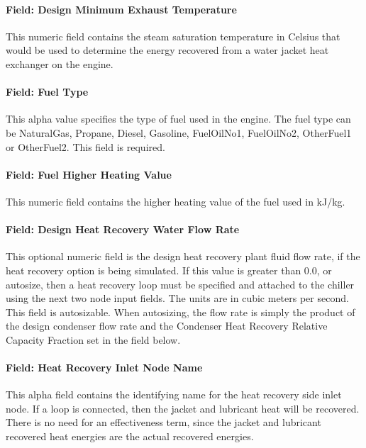 \paragraph{Field: Design Minimum Exhaust Temperature}\label{field-design-minimum-exhaust-temperature-000}

This numeric field contains the steam saturation temperature in Celsius that would be used to determine the energy recovered from a water jacket heat exchanger on the engine.

\paragraph{Field: Fuel Type}\label{field-fuel-type-002}

This alpha value specifies the type of fuel used in the engine. The fuel type can be NaturalGas, Propane, Diesel, Gasoline, FuelOilNo1, FuelOilNo2, OtherFuel1 or OtherFuel2. This field is required.

\paragraph{Field: Fuel Higher Heating Value}\label{field-fuel-higher-heating-value-000}

This numeric field contains the higher heating value of the fuel used in kJ/kg.

\paragraph{Field: Design Heat Recovery Water Flow Rate}\label{field-design-heat-recovery-water-flow-rate-3}

This optional numeric field is the design heat recovery plant fluid flow rate, if the heat recovery option is being simulated. If this value is greater than 0.0, or autosize, then a heat recovery loop must be specified and attached to the chiller using the next two node input fields. The units are in cubic meters per second. This field is autosizable. When autosizing, the flow rate is simply the product of the design condenser flow rate and the Condenser Heat Recovery Relative Capacity Fraction set in the field below.

\paragraph{Field: Heat Recovery Inlet Node Name}\label{field-heat-recovery-inlet-node-name-3}

This alpha field contains the identifying name for the heat recovery side inlet node. If a loop is connected, then the jacket and lubricant heat will be recovered. There is no need for an effectiveness term, since the jacket and lubricant recovered heat energies are the actual recovered energies.

